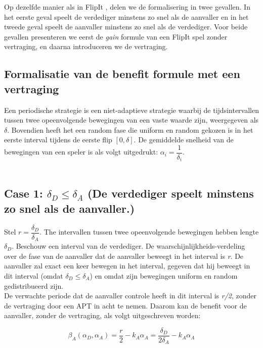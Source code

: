 \documentclass[master=cws, masteroption=vs,english]{kulemt}
\begin{document}
\begin{abstract*}
Op dezelfde manier als in FlipIt \citep{FlipIt}, delen we de formalisering in twee gevallen. In het eerste geval speelt de verdediger minstens zo snel als de aanvaller en in het tweede geval speelt de aanvaller minstens zo snel als de verdediger. Voor beide gevallen presenteren we eerst de \textit{gain} formule van een FlipIt spel zonder vertraging, en daarna introduceren we de vertraging. \\

\subsection{ Formalisatie van de benefit formule met een vertraging}
Een periodische strategie is een niet-adaptieve strategie waarbij de tijdsintervallen tussen twee opeenvolgende bewegingen van een vaste waarde zijn, weergegeven als $\delta$. Bovendien heeft het een random fase die uniform en random gekozen is in het eerste interval tijdens de eerste flip $[0,\delta]$. De gemiddelde snelheid van de bewegingen van een speler is als volgt uitgedrukt: $\alpha_{i} = \dfrac{1}{\delta_{i}}$. \\
~~\\

\subsection*{\textbf{Case 1:} $\delta_{D} \leq \delta_{A} $ (De verdediger speelt minstens zo snel als de aanvaller.) }

Stel $r = \dfrac{\delta_{D}}{ \delta_{A} }$. The intervallen tussen twee opeenvolgende bewegingen hebben lengte $\delta_{D}$. Beschouw een interval van de verdediger. De waarschijnlijkheids-verdeling over de fase van de aanvaller dat de aanvaller beweegt in het interval is \textit{r}. De aanvaller zal exact een keer bewegen in het interval, gegeven dat hij beweegt in dit interval (omdat $\delta_{D} \leq \delta_{A} $) en omdat zijn bewegingen uniform en random gedistribueerd zijn. \\

De verwachte periode dat de aanvaller controle heeft in dit interval is \textit{r/2}, zonder de vertraging door een APT in acht te nemen. Daarom kan de benefit voor de aanvaller, zonder de vertraging, als volgt uitgeschreven worden:

\begin{equation}\label{first}
\beta_{A}(\alpha_{D},\alpha_{A}) =\dfrac {r} {2} - k_{A} \alpha_{A} = \dfrac {\delta_{D}} {2\delta_{A}} - k_{A} \alpha_{A}  
\end{equation}\\


\end{abstract*}
\end{document}
